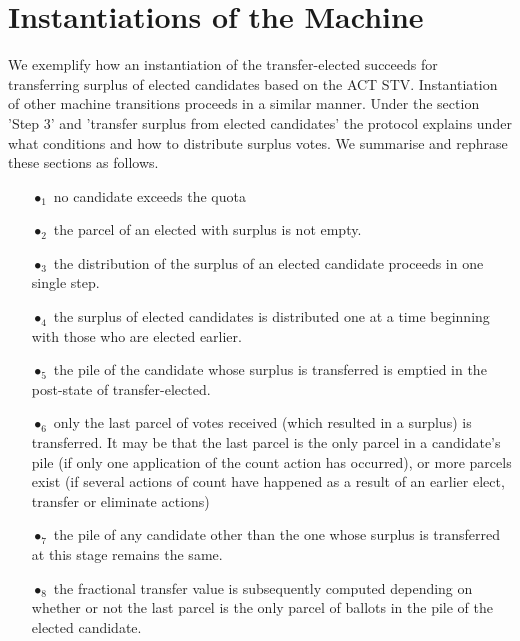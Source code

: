\documentclass[10pt,conference]{IEEEtran}
\begin{document}
\section{Instantiations of the Machine}\label{sec:InstMachine}
We exemplify how an instantiation of the transfer-elected succeeds for transferring surplus of elected candidates based on the ACT STV.
 Instantiation of other machine transitions proceeds in a  similar manner. Under the section 'Step 3' and 'transfer surplus from elected candidates' the protocol explains under what conditions and how to distribute surplus votes. We summarise and rephrase these sections as follows. 
\begin{itemize}
\item[$\bullet_{1}$] no  candidate exceeds the quota
\item[$\bullet_{2}$] the  parcel of an elected with surplus is not empty.
\item[$\bullet_{3}$] the distribution of the surplus of an elected candidate proceeds in one single step.
\item[$\bullet_{4}$] the surplus of elected candidates is distributed one at a time beginning with those who are elected earlier. 
\item[$\bullet_{5}$] the pile of the candidate whose surplus is transferred is emptied in the post-state of transfer-elected.
\item[$\bullet_{6}$] only the last parcel of votes received (which resulted in a surplus) is transferred. It may be that the last parcel is the only parcel in a candidate's pile (if only one application of the count action has occurred), or more parcels exist (if several actions of count have happened as a result of an earlier  elect, transfer or eliminate actions)
\item[$\bullet_{7}$] the pile of any candidate other than the one whose surplus is transferred at this stage remains the same.
\item[$\bullet_{8}$] the fractional transfer value is subsequently computed depending on whether or not the last parcel is the only parcel of ballots in the pile of the elected candidate. 
\end{itemize}
\end{document}
